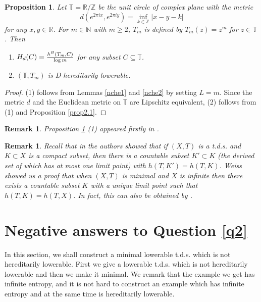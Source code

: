 \documentclass[12pt]{amsart}
\newtheorem{prop}[thm]{Proposition}
\newtheorem{rem}[thm]{Remark}
\theoremstyle{definition} \theoremstyle{question}
\numberwithin{equation}{section}
\begin{document}
\begin{prop}\label{L-exapnsive} Let
$\mathbb{T}=\mathbb{R}/\mathbb{Z}$ be the unit circle of complex
plane with the metric $$d(e^{2\pi i x},e^{2\pi i y})=\inf_{k\in
\mathbb{Z}}|x-y-k|$$ for any $x,y\in \mathbb{R}$. For $m\in
\mathbb{N}$ with $m\ge 2$, $T_m$ is defined by $T_m(z)=z^m$ for
$z\in \mathbb{T}$. Then
\begin{enumerate}
\item $H_d(C)={h^{B}(T_m, C)\over\log m}$ for any
subset $C\subseteq \mathbb{T}$.

\item $(\mathbb{T},T_m)$ is D-hereditarily lowerable.
\end{enumerate}
\end{prop}
\begin{proof} (1) follows from Lemmas \ref{nche1} and \ref{nche2} by
setting $L=m$.  Since the metric $d$ and the Euclidean metric on
$\mathbb{T}$ are Lipschitz equivalent,   (2) follows from (1) and
Proposition \ref{prop2.1}.
\end{proof}

\begin{rem} Proposition \ref{L-exapnsive} (1) appeared firstly in \cite[Proposition III.1]{Fu0}.
\end{rem}

\begin{rem} Recall that in \cite[Remark 5.13]{YZ} the authors showed that if $(X,T)$ is a
t.d.s. and $K\subset X$ is a compact subset, then there is a
countable subset $K'\subset K$ (the derived set of which has at most
one limit point) with $h(T,K')=h(T,K)$. Weiss showed us a proof that
when $(X,T)$ is minimal and $X$ is infinite then there exists a countable subset $K$
with a unique limit point such that $h(T,K)=h(T,X)$. In fact, this
can also be obtained by \cite[Theorems 4.2 and 5.7]{YZ}.
\end{rem}

\section{Negative answers to Question \ref{q2}}

In this section, we shall construct a minimal lowerable t.d.s. which
is not hereditarily lowerable. First we give a lowerable t.d.s.
which is not hereditarily lowerable and then we make it minimal. We
remark that the example we get has infinite entropy, and it is not
hard to construct an example which has infinite entropy and at the
same time is hereditarily lowerable.
\end{document}
